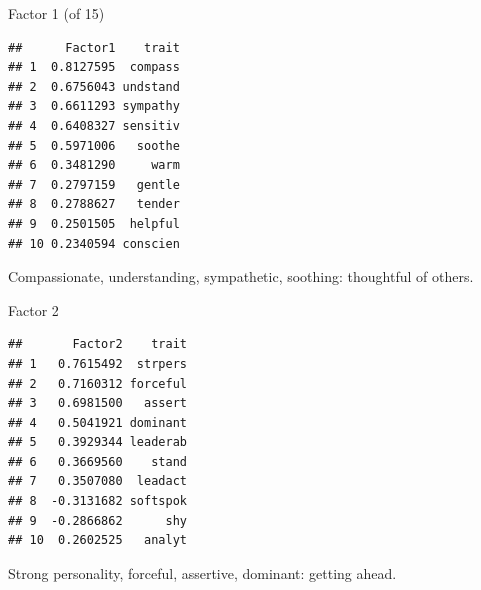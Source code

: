 \documentclass[ignorenonframetext,]{beamer}
\newenvironment{Shaded}{\begin{snugshade}}{\end{snugshade}}
\newcommand{\DecValTok}[1]{\textcolor[rgb]{0.00,0.00,0.81}{#1}}
\newcommand{\KeywordTok}[1]{\textcolor[rgb]{0.13,0.29,0.53}{\textbf{#1}}}
\newcommand{\NormalTok}[1]{#1}
\newcommand{\OperatorTok}[1]{\textcolor[rgb]{0.81,0.36,0.00}{\textbf{#1}}}
\newcommand{\StringTok}[1]{\textcolor[rgb]{0.31,0.60,0.02}{#1}}
\begin{document}
\begin{frame}[fragile]{Factor 1 (of 15)}
\protect\hypertarget{factor-1-of-15}{}

\footnotesize

\begin{Shaded}
\end{Shaded}

\begin{verbatim}
##      Factor1    trait
## 1  0.8127595  compass
## 2  0.6756043 undstand
## 3  0.6611293 sympathy
## 4  0.6408327 sensitiv
## 5  0.5971006   soothe
## 6  0.3481290     warm
## 7  0.2797159   gentle
## 8  0.2788627   tender
## 9  0.2501505  helpful
## 10 0.2340594 conscien
\end{verbatim}

\normalsize

Compassionate, understanding, sympathetic, soothing: thoughtful of
others.

\end{frame}

\begin{frame}[fragile]{Factor 2}
\protect\hypertarget{factor-2}{}

\footnotesize

\begin{Shaded}
\end{Shaded}

\begin{verbatim}
##       Factor2    trait
## 1   0.7615492  strpers
## 2   0.7160312 forceful
## 3   0.6981500   assert
## 4   0.5041921 dominant
## 5   0.3929344 leaderab
## 6   0.3669560    stand
## 7   0.3507080  leadact
## 8  -0.3131682 softspok
## 9  -0.2866862      shy
## 10  0.2602525   analyt
\end{verbatim}

\normalsize

Strong personality, forceful, assertive, dominant: getting ahead.

\end{frame}
\end{document}
